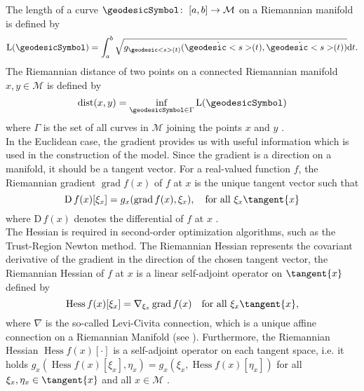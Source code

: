 The length of a curve $\geodesicSymbol \colon \; [a,b] \to \mathcal{M}$ on a Riemannian manifold is defined by
\begin{equation*}
    \mathrm{L}(\geodesicSymbol) = \int^{b}_a \sqrt{ g_{\geodesic<s>(t)} (\dot{\geodesic<s>}(t), \dot{\geodesic<s>}(t)) } \mathrm{d}t.
\end{equation*}
The Riemannian distance of two points on a connected Riemannian manifold $x,y \in \mathcal{M}$ is defined by
\begin{equation*}
    \operatorname{dist}(x,y) = \inf_{\geodesicSymbol \in \Gamma} \mathrm{L}(\geodesicSymbol)
\end{equation*}
where $\Gamma$ is the set of all curves in $\mathcal{M}$ joining the points $x$ and $y$ \cite[p.~46]{AbsilMahonySepulchre:2008}. \\
In the Euclidean case, the gradient provides us with useful information which is used in the construction of the model. Since the gradient is a direction on a manifold, it should be a tangent vector. For a real-valued function $f$, the Riemannian gradient $\operatorname{grad} f(x)$ of $f$ at $x$ is the unique tangent vector such that
\begin{equation*}
    \mathrm{D} \, f(x) [\xi_x] = g_x (\operatorname{grad} f(x), \xi_x), \quad \text{for all } \xi_x \tangent{x}
\end{equation*}
where $\mathrm{D} \, f(x)$ denotes the differential of $f$ at $x$ \cite[p.~46]{AbsilMahonySepulchre:2008}. \\
The Hessian is required in second-order optimization algorithms, such as the Trust-Region Newton method. The Riemannian Hessian represents the covariant derivative of the gradient in the direction of the chosen tangent vector, the Riemannian Hessian of $f$ at $x$ is a linear self-adjoint operator on $\tangent{x}$ defined by
\begin{equation*}
    \operatorname{Hess} f(x) [\xi_{x}] = \nabla_{\xi_{x}} \operatorname{grad} f(x) \quad \text{for all } \xi_x \tangent{x},
\end{equation*}
where $\nabla$ is the so-called Levi-Civita connection, which is a unique affine connection on a Riemannian Manifold (see \cite[Theorem~5.3.1~(Levi-Civita)]{AbsilMahonySepulchre:2008}). Furthermore, the Riemannian Hessian $\operatorname{Hess} f(x) [\cdot]$ is a self-adjoint operator on each tangent space, i.e. it holds $g_x(\operatorname{Hess} f(x) [\xi_{x}], \eta_x) = g_x(\xi_{x}, \operatorname{Hess} f(x) [\eta_x])$ for all $\xi_x, \eta_x \in \tangent{x}$ and all $x \in \mathcal{M}$ \cite[p.~105]{AbsilMahonySepulchre:2008}. \\
